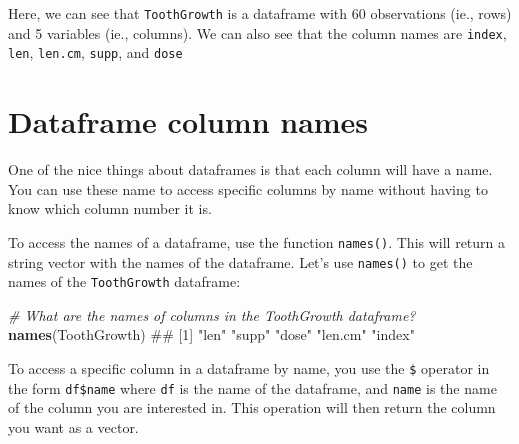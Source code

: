 \documentclass[]{book}
\newenvironment{Shaded}{\begin{snugshade}}{\end{snugshade}}
\newcommand{\KeywordTok}[1]{\textcolor[rgb]{0.13,0.29,0.53}{\textbf{#1}}}
\newcommand{\CommentTok}[1]{\textcolor[rgb]{0.56,0.35,0.01}{\textit{#1}}}
\newcommand{\NormalTok}[1]{#1}
\theoremstyle{definition}
\theoremstyle{definition}
\theoremstyle{remark}
\begin{document}
\begin{Shaded}
\end{Shaded}

Here, we can see that \texttt{ToothGrowth} is a dataframe with 60
observations (ie., rows) and 5 variables (ie., columns). We can also see
that the column names are \texttt{index}, \texttt{len}, \texttt{len.cm},
\texttt{supp}, and \texttt{dose}

\section{Dataframe column names}\label{dataframe-column-names}

One of the nice things about dataframes is that each column will have a
name. You can use these name to access specific columns by name without
having to know which column number it is.

To access the names of a dataframe, use the function \texttt{names()}.
This will return a string vector with the names of the dataframe. Let's
use \texttt{names()} to get the names of the \texttt{ToothGrowth}
dataframe:

\begin{Shaded}
\begin{Highlighting}[]
\CommentTok{# What are the names of columns in the ToothGrowth dataframe?}
\KeywordTok{names}\NormalTok{(ToothGrowth)}
\NormalTok{## [1] "len"    "supp"   "dose"   "len.cm" "index"}
\end{Highlighting}
\end{Shaded}

To access a specific column in a dataframe by name, you use the
\texttt{\$} operator in the form \texttt{df\$name} where \texttt{df} is
the name of the dataframe, and \texttt{name} is the name of the column
you are interested in. This operation will then return the column you
want as a vector.
\end{document}
